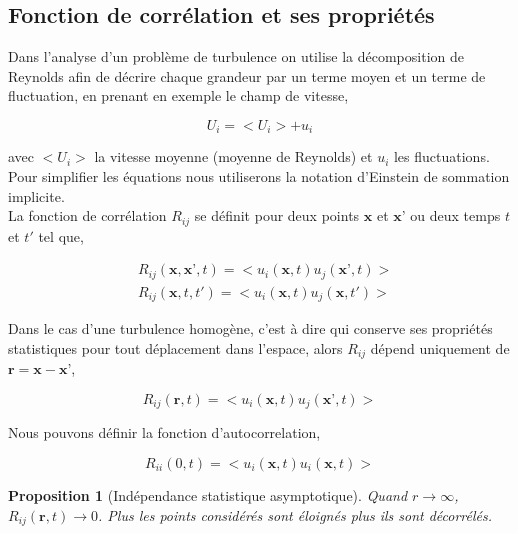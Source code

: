\documentclass[12pt]{article}   %
\theoremstyle{plain}
\newtheorem{proposition}[theorem]{Proposition}
\theoremstyle{remark}
\begin{document}
	\subsection{Fonction de corrélation et ses propriétés}
		
		Dans l'analyse d'un problème de turbulence on utilise la décomposition de Reynolds afin de décrire chaque grandeur par un terme moyen et un terme de fluctuation, en prenant en exemple le champ de vitesse, 
		
		\begin{equation}
			U_i=<U_i> + u_i 	
		\end{equation}
	
		avec $<U_i>$ la vitesse moyenne (moyenne de Reynolds) et $u_i$ les fluctuations. \\
		Pour simplifier les équations nous utiliserons la notation d'Einstein de sommation implicite. \\
		La fonction de corrélation $R_{ij}$ se définit pour deux points $\textbf{x}$ et $\textbf{x'}$ ou deux temps $t$ et $t'$ tel que,
		
		\begin{equation}
		\begin{split}
			&R_{ij}(\textbf{x},\textbf{x'},t) = <u_i(\textbf{x},t) u_j(\textbf{x'},t)> \\
			&R_{ij}(\textbf{x},t,t') = <u_i(\textbf{x},t) u_j(\textbf{x},t')>
		\end{split}
		\end{equation}
	
		Dans le cas d'une turbulence homogène, c'est à dire qui conserve ses propriétés statistiques pour tout déplacement dans l'espace, alors $R_{ij}$ dépend uniquement de $\textbf{r}=\textbf{x}-\textbf{x'}$,
		
		\begin{equation}
			R_{ij}(\textbf{r},t) = <u_i(\textbf{x},t) u_j(\textbf{x'},t)>
			\label{eq:correlation}
		\end{equation}
	
		Nous pouvons définir la fonction d'autocorrelation,
		
		\begin{equation}
			R_{ii}(0,t) = <u_i(\textbf{x},t) u_i(\textbf{x},t)>
		\end{equation}
	
		\begin{proposition}[Indépendance statistique asymptotique]
			Quand $r\rightarrow\infty$, $R_{ij}(\textbf{r},t)\rightarrow0$. Plus les points considérés sont éloignés plus ils sont décorrélés.
		\end{proposition}
	
\end{document}
